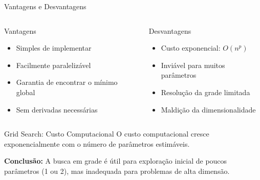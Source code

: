 \begin{frame}{Vantagens e Desvantagens}
\begin{columns}
\begin{block}{Vantagens}\small
\begin{itemize}
    \item Simples de implementar
    \item Facilmente paralelizável
    \item Garantia de encontrar o mínimo global
    \item Sem derivadas necessárias
\end{itemize}
\end{block}

\begin{alertblock}{Desvantagens}\small
\begin{itemize}
    \item Custo exponencial: $O(n^p)$
    \item Inviável para muitos parâmetros
    \item Resolução da grade limitada
    \item Maldição da dimensionalidade
\end{itemize}
\end{alertblock}
\end{columns}
\end{frame}

\begin{frame}{Grid Search: Custo Computacional}
O custo computacional cresce exponencialmente com o número de parâmetros estimáveis.


\vspace{0.3cm}
\textbf{Conclusão:} A busca em grade é útil para exploração inicial de poucos parâmetros (1 ou 2), mas inadequada para problemas de alta dimensão.
\end{frame}


